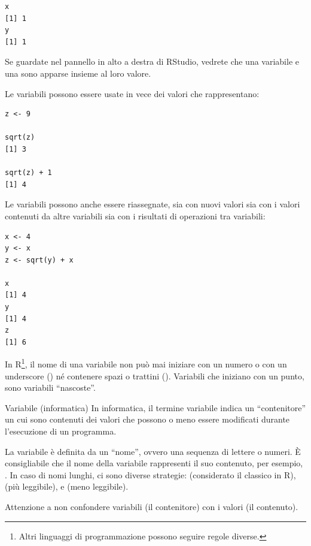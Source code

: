 \begin{lstlisting}[style=Rstyle]
x
[1] 1
y
[1] 1
\end{lstlisting}

\noindent
Se guardate nel pannello in alto a destra di RStudio, vedrete che una variabile  e una  sono apparse insieme al loro valore.

\vspace{0.2cm}

\noindent
Le variabili possono essere usate in vece dei valori che rappresentano:

\begin{lstlisting}[style=Rstyle]
z <- 9

sqrt(z)
[1] 3

sqrt(z) + 1
[1] 4
\end{lstlisting}
%
Le variabili possono anche essere riassegnate, sia con nuovi valori sia con i valori contenuti da altre variabili sia con i risultati di operazioni tra variabili:

\begin{lstlisting}[style=Rstyle]
x <- 4
y <- x
z <- sqrt(y) + x

x
[1] 4
y
[1] 4
z
[1] 6
\end{lstlisting}

\noindent In R\footnote{Altri linguaggi di programmazione possono seguire regole diverse.}, il nome di una variabile non pu\`o mai iniziare con un numero o con un underscore (\lsin{_}) n\'e contenere spazi o trattini (\lsin{-}). Variabili che iniziano con un punto, sono variabili ``nascoste''. 

\begin{mybox}{Variabile (informatica)}
In informatica, il termine variabile indica un ``contenitore'' un cui sono contenuti dei valori che possono o meno essere modificati durante l'esecuzione di un programma.

La variabile \`e definita da un ``nome'', ovvero una sequenza di lettere o numeri. \`E consigliabile che il nome della variabile rappresenti il suo contenuto, per esempio, . In caso di nomi lunghi, ci sono diverse strategie: 
 (considerato il classico in R),
 (pi\`u leggibile), e
 (meno leggibile).

Attenzione a non confondere variabili (il contenitore) con i valori (il contenuto).
\end{mybox}


\vspace{0.5cm} 

